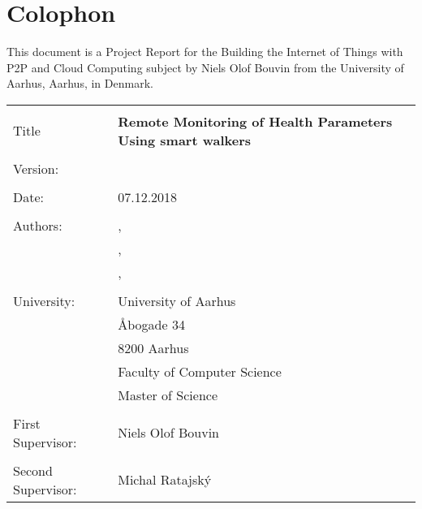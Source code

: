 \pagestyle{empty}

\hfill

\vfill


\section*{Colophon}
This document is a Project Report for the Building the Internet of Things with P2P and Cloud Computing subject by Niels Olof Bouvin from the University of Aarhus, Aarhus, in Denmark. 

\begin{table}[h]
	\begin{tabular}{ll}
		\textbf{} &  \\
		Title & \textbf{Remote Monitoring of Health Parameters Using smart walkers} \\
		&\\
		Version: & \noindent\finalVersionString\\
		&\\
		Date: & 07.12.2018 \\
		&\\
		Authors: & \myNameP,\myStudentIdP \\
		& \myNameH,\myStudentIdH \\
		& \myNameT,\myStudentIdT \\
		&\\
		University: & University of Aarhus \\
		& Åbogade 34\\
		& 8200 Aarhus\\
		& Faculty of Computer Science \\
		& Master of Science\\
		&\\
		First Supervisor: & Niels Olof Bouvin \\
		&\\
		Second Supervisor: & Michal Ratajský \\
		
	\end{tabular}\\
\end{table}
 
\bigskip


